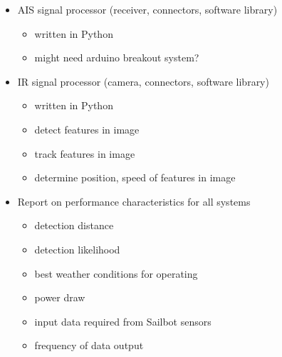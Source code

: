 \begin{itemize}
\item AIS signal processor (receiver, connectors, software library)
\begin{itemize}
\item written in Python
\item might need arduino breakout system?
\end{itemize}

\item IR signal processor (camera, connectors, software library)
\begin{itemize}
\item written in Python
\item detect features in image
\item track features in image
\item determine position, speed of features in image
\end{itemize}

\item Report on performance characteristics for all systems
\begin{itemize}
\item detection distance
\item detection likelihood
\item best weather conditions for operating
\item power draw
\item input data required from Sailbot sensors
\item frequency of data output
\end{itemize}
\end{itemize}